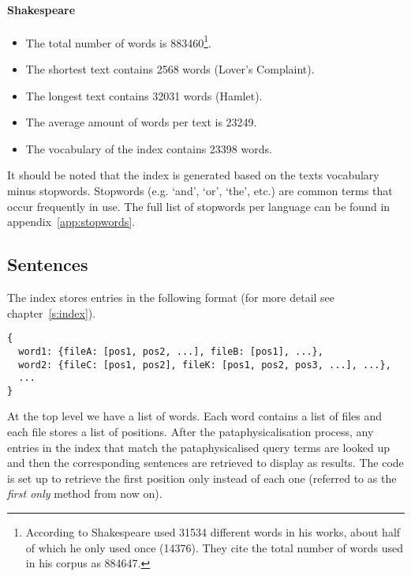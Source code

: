 \paragraph*{Shakespeare}
\begin{itemize}
\vspace{-0.5cm}
  \item The total number of words is \num{883460}\footnote{According to \autocite{Efron1976} Shakespeare used \num{31534} different words in his works, about half of which he only used once (\num{14376}). They cite the total number of words used in his corpus as \num{884647}.}.
  \item The shortest text contains \num{2568} words (Lover's Complaint).
  \item The longest text contains \num{32031} words (Hamlet).
  \item The average amount of words per text is \num{23249}.
  \item The vocabulary of the index contains \num{23398} words.
\end{itemize}

It should be noted that the index is generated based on the texts vocabulary minus stopwords. Stopwords (e.g. `and', `or', `the', etc.) are common terms that occur frequently in use. The full list of stopwords per language can be found in appendix~\ref{app:stopwords}.


\subsection{Sentences}
\label{s:sents}

The index stores entries in the following format (for more detail see chapter~\ref{s:index}).

\begin{verbatim}
{
  word1: {fileA: [pos1, pos2, ...], fileB: [pos1], ...},
  word2: {fileC: [pos1, pos2], fileK: [pos1, pos2, pos3, ...], ...},
  ...
}
\end{verbatim}

At the top level we have a list of words. Each word contains a list of files and each file stores a list of positions. After the pataphysicalisation process, any entries in the index that match the pataphysicalised query terms are looked up and then the corresponding sentences are retrieved to display as results. The code is set up to retrieve the first position only instead of each one (referred to as the \emph{first only} method from now on).

